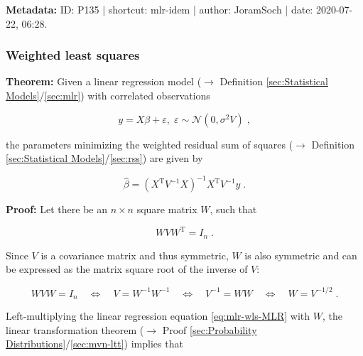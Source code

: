 \documentclass[a4paper,12pt,twoside]{book}
\begin{document}
\vspace{1em}
\textbf{Metadata:} ID: P135 | shortcut: mlr-idem | author: JoramSoch | date: 2020-07-22, 06:28.
\vspace{1em}



\subsubsection[\textbf{Weighted least squares}]{Weighted least squares} \label{sec:mlr-wls}
\setcounter{equation}{0}

\textbf{Theorem:} Given a linear regression model ($\rightarrow$ Definition \ref{sec:Statistical Models}/\ref{sec:mlr}) with correlated observations

\begin{equation} \label{eq:mlr-wls-MLR}
y = X\beta + \varepsilon, \; \varepsilon \sim \mathcal{N}(0, \sigma^2 V) \; ,
\end{equation}

the parameters minimizing the weighted residual sum of squares ($\rightarrow$ Definition \ref{sec:Statistical Models}/\ref{sec:rss}) are given by

\begin{equation} \label{eq:mlr-wls-WLS}
\hat{\beta} = (X^\mathrm{T} V^{-1} X)^{-1} X^\mathrm{T} V^{-1} y \; .
\end{equation}


\vspace{1em}
\textbf{Proof:} Let there be an $n \times n$ square matrix $W$, such that

\begin{equation} \label{eq:mlr-wls-W-def}
W V W^\mathrm{T} = I_n \; .
\end{equation}

Since $V$ is a covariance matrix and thus symmetric, $W$ is also symmetric and can be expressed as the matrix square root of the inverse of $V$:

\begin{equation} \label{eq:mlr-wls-W-V}
W V W = I_n \quad \Leftrightarrow \quad V = W^{-1} W^{-1} \quad \Leftrightarrow \quad V^{-1} = W W \quad \Leftrightarrow \quad W = V^{-1/2} \; .
\end{equation}

Left-multiplying the linear regression equation \eqref{eq:mlr-wls-MLR} with $W$, the linear transformation theorem ($\rightarrow$ Proof \ref{sec:Probability Distributions}/\ref{sec:mvn-ltt}) implies that
\end{document}
